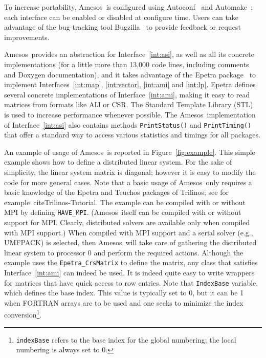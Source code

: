 \documentclass[acmtoms,acmnow]{acmtrans2m}
\newcommand{\amesos}{{\sc Amesos}}
\begin{document}
To increase portability, \amesos\ is configured using
Autoconf~\cite{Autoconf} and Automake~\cite{Automake}; each
interface can be enabled or disabled at configure time. Users can
take advantage of the bug-tracking tool Bugzilla~\cite{Bugzilla} to
provide feedback or request improvements.

\medskip

\amesos\ provides an abstraction for Interface~\ref{int:asi}, as
well as all its concrete implementations (for a little more than
13,000 code lines, including comments and Doxygen
documentation), and it takes advantage of the {\sc Epetra}
package~\cite{Epetra-Ref-Guide} to implement
Interfaces~\ref{int:map}, \ref{int:vector}, \ref{int:ami} and
\ref{int:lp}. {\sc Epetra} defines several concrete implementations
of Interface~\ref{int:ami}, making it easy to read matrices from
formats
  like AIJ or CSR.
The Standard Template Library (STL)~\cite{wise96overview} is used to
increase performance whenever possible. The \amesos\ implementation
of Interface~\ref{int:asi} also contains methods {\tt PrintStatus()}
and {\tt PrintTiming()} that offer a standard way to access various
statistics and timings for all packages.

An example of usage of \amesos\ is reported in
Figure~\ref{fig:example}. This simple example shows how to define a
distributed linear system. For the sake of simplicity, the linear
system matrix is diagonal; however it is easy to modify the code for
more general cases. Note that a basic usage of \amesos\ only
requires a basic knowledge of the Epetra and Teuchos packages of
Trilinos; see for example~cite{Trilinos-Tutorial}. The example can
be compiled with or without MPI by defining \verb!HAVE_MPI!.
(\amesos\ itself can be compiled with or without support for MPI.
Clearly, distributed solvers are available only when compiled with
MPI support.) When compiled with MPI support and a serial solver
(e.g., UMFPACK) is selected, then \amesos\ will take care of
gathering the distributed linear system to processor 0 and perform
the required actions. Although the example uses the
\verb!Epetra_CrsMatrix! to define the matrix, any class that
satisfies Interface~\ref{int:ami} can indeed be used. It is indeed
quite easy to write wrappers for matrices that have quick access to
row entries. Note that \verb!IndexBase! variable, which defines the
base index. This value is typically set to 0, but it can  be 1 when
FORTRAN arrays are to be used and one seeks to minimize the index
conversion\footnote{{\tt indexBase} refers to the base index for the
global numbering; the local numbering is always set to 0.}.
\end{document}
